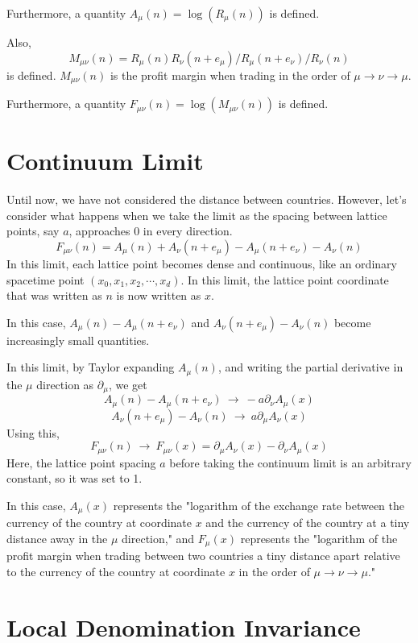 \documentclass[uplatex]{jsarticle}
\begin{document}
Furthermore, a quantity $A_{\mu}(n) = \log (R_{\mu}(n))$ is defined.

Also,
$$
	M_{\mu \nu}(n)
	=
	R_{\mu}(n) R_{\nu}(n+e_{\mu})
	/ R_{\mu}(n+e_{\nu})
	/ R_{\nu}(n)
$$
is defined.
$M_{\mu \nu}(n)$ is the profit margin when trading in the order of $\mu \to \nu \to \mu$.

Furthermore, a quantity $F_{\mu \nu}(n) = \log (M_{\mu \nu}(n))$ is defined.



\section{\textbf{Continuum Limit}}

Until now, we have not considered the distance between countries. However, let's consider what happens when we take the limit as the spacing between lattice points, say $a$, approaches 0 in every direction.
$$
	F_{\mu \nu}(n) =
	A_{\mu}(n) + A_{\nu}(n+e_{\mu})
	- A_{\mu}(n+e_{\nu})
	- A_{\nu}(n)
$$
In this limit, each lattice point becomes dense and continuous, like an ordinary spacetime point $(x_{0},x_{1},x_{2},\cdots,x_{d})$.
In this limit, the lattice point coordinate that was written as $n$ is now written as $x$.

In this case,
$
	A_{\mu}(n) - A_{\mu}(n+e_{\nu})
$
and
$
	A_{\nu}(n+e_{\mu}) - A_{\nu}(n)
$
become increasingly small quantities.

In this limit, by Taylor expanding $A_{\mu}(n)$, and writing the partial derivative in the $\mu$ direction as $\partial_{\mu}$, we get
$$
	A_{\mu}(n) - A_{\mu}(n+e_{\nu})
	\ \to \
	- a \partial_{\nu} A_{\mu} (x)
$$
$$
	A_{\nu}(n+e_{\mu}) - A_{\nu}(n)
	\ \to \
	a \partial_{\mu} A_{\nu} (x)
$$
Using this,
$$
	F_{\mu \nu}(n)
	\ \to \
	F_{\mu \nu}(x)
	=
	\partial_{\mu} A_{\nu} (x)
	-
	\partial_{\nu} A_{\mu} (x)
$$
Here, the lattice point spacing $a$ before taking the continuum limit is an arbitrary constant, so it was set to 1.

In this case,
$A_{\mu} (x)$
represents the "logarithm of the exchange rate between the currency of the country at coordinate $x$ and the currency of the country at a tiny distance away in the $\mu$ direction," and
$F_{\mu} (x)$
represents the "logarithm of the profit margin when trading between two countries a tiny distance apart relative to the currency of the country at coordinate $x$ in the order of $\mu \to \nu \to \mu$."



\section{\textbf{Local Denomination Invariance}}
\end{document}
